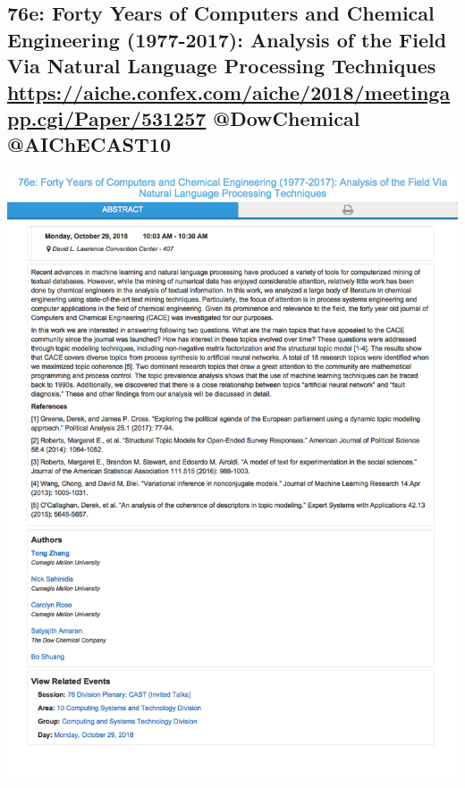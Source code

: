 \documentclass[11pt]{article}
\begin{document}
\subsection{76e: Forty Years of Computers and Chemical Engineering (1977-2017): Analysis of the Field Via Natural Language Processing Techniques \url{https://aiche.confex.com/aiche/2018/meetingapp.cgi/Paper/531257} @DowChemical @AIChECAST10}
\label{sec:org0614dcd}
\begin{center}
\includegraphics[width=.9\linewidth]{./531257.png}
\end{center}
\end{document}
